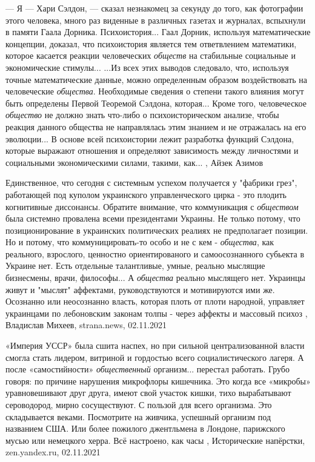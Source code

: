 — Я — Хари Сэлдон, — сказал незнакомец за секунду до того, как фотографии этого
человека, много раз виденные в различных газетах и журналах, вспыхнули в памяти
Гаала Дорника.  Психоистория... Гаал Дорник, используя математические
концепции, доказал, что психоистория является тем ответвлением математики,
которое касается реакции человеческих \emph{обществ} на стабильные социальные и
экономические стимулы... ...Из всех этих выводов следовало, что, используя точные
математические данные, можно определенным образом воздействовать на
человеческие \emph{общества}. Необходимые сведения о степени такого влияния могут быть
определены Первой Теоремой Сэлдона, которая... Кроме того, человеческое \emph{общество}
не должно знать что-либо о психоисторическом анализе, чтобы реакция данного
общества не направлялась этим знанием и не отражалась на его эволюции...  В
основе всей психоистории лежит разработка функций Сэлдона, которые выражают
отношения и определяют зависимость между личностями и социальными
экономическими силами, такими, как...
, Айзек Азимов

Единственное, что сегодня с системным успехом получается у "фабрики грез",
работающей под куполом украинского управленческого цирка - это плодить
когнитивные диссонансы.  Обратите внимание, что коммуникация с \emph{обществом} была
системно провалена всеми президентами Украины. Не только потому, что
позиционирование в украинских политических реалиях не предполагает позиции. Но
и потому, что коммуницировать-то особо и не с кем - \emph{общества}, как реального,
взрослого, ценностно ориентированого и самоосознанного субьекта в Украине нет.
Есть отдельные талантливые, умные, реально мыслящие бизнесмены, врачи,
философы... А \emph{общества} реально мыслящего нет.  Украинцы живут и "мыслят"
аффектами, руководствуются и мотивируются ими же.  Осознанно или неосознанно
власть, которая плоть от плоти народной, управляет украинцами по лебоновским
законам толпы - через аффекты и массовый психоз
, 
Владислав Михеев, strana.news, 02.11.2021

«Империя УССР» была сшита наспех, но при сильной централизованной власти смогла
стать лидером, витриной и гордостью всего социалистического лагеря. А после
«самостийности» \emph{общественный} организм... перестал работать. Грубо говоря: по
причине нарушения микрофлоры кишечника. Это когда все «микробы» уравновешивают
друг друга, имеют свой участок кишки, тихо вырабатывают сероводород, мирно
сосуществуют. С пользой для всего организма.
Это складывается веками. Посмотрите на живчика, успешный организм под названием
США. Или более пожилого джентльмена в Лондоне, парижского мусью или немецкого
херра. Всё настроено, как часы
, 
Исторические напёрстки, zen.yandex.ru, 02.11.2021

